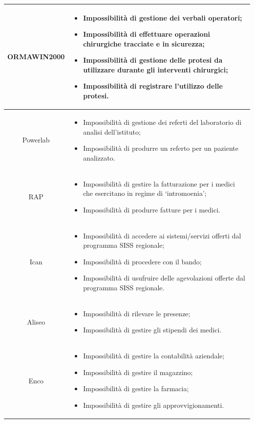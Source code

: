 \documentclass[12pt, a4paper, titlepage]{report}
\begin{document}
\begin{longtable}{| c | p{10cm} |}
				ORMAWIN2000 & \begin{itemize}\item Impossibilità di gestione dei verbali operatori; \item Impossibilità di effettuare operazioni chirurgiche tracciate e in sicurezza; \item Impossibilità di gestione delle protesi da utilizzare durante gli interventi chirurgici; \item Impossibilità di registrare l'utilizzo delle protesi.	\end{itemize}\\ \hline
				Powerlab & \begin{itemize}\item Impossibilità di gestione dei referti del laboratorio di analisi dell'istituto; \item Impossibilità di produrre un referto per un paziente analizzato.		\end{itemize} \\ \hline
				RAP & \begin{itemize}\item Impossibilità di gestire la fatturazione per i medici che esercitano in regime di `intromoenia'; \item Impossibilità di produrre fatture per i medici.	\end{itemize}\\ \hline
				Ican & \begin{itemize}\item Impossibilità di accedere ai sistemi/servizi offerti dal programma SISS regionale; \item Impossibilità di procedere con il bando; \item Impossibilità di usufruire delle agevolazioni offerte dal programma SISS regionale.		\end{itemize}\\ \hline
				Aliseo & \begin{itemize}\item Impossibilità di rilevare le presenze; \item Impossibilità di gestire gli stipendi dei medici.\end{itemize}\\ \hline
				Enco & \begin{itemize}\item Impossibilità di gestire la contabilità aziendale; \item Impossibilità di gestire il magazzino; \item Impossibilità di gestire la farmacia; \item Impossibilità di gestire gli approvvigionamenti.	\end{itemize}\\ \hline

\end{longtable}
\end{document}
